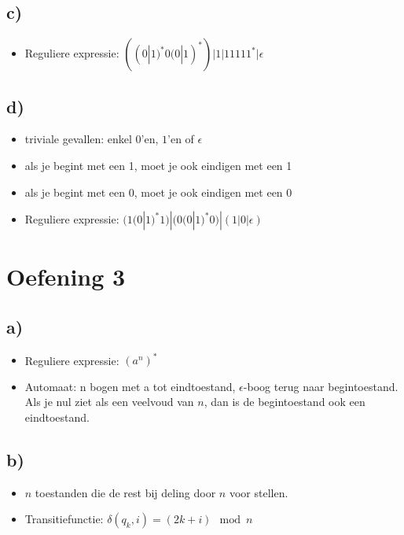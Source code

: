 \documentclass[12pt]{article}
\begin{document}
    \subsection{c)}
    \begin{itemize}
        \item Reguliere expressie: $ ((0|1)^{*}0(0|1)^{*})|1|11111^{*}|\epsilon $
    \end{itemize}
    
    \subsection{d)}
    \begin{itemize}
        \item triviale gevallen: enkel $0$'en, $1$'en of $\epsilon$
        \item als je begint met een 1, moet je ook eindigen met een 1
        \item als je begint met een 0, moet je ook eindigen met een 0
        \item Reguliere expressie:  $ (1 (0|1)^{*} 1) | (0 (0|1)^{*} 0) | (1|0|\epsilon)$
    \end{itemize}
    
    \section{Oefening 3}
    \subsection{a)}
    \begin{itemize}
        \item Reguliere expressie: $ (a^{n})^{*} $
        \item Automaat: n bogen met a tot eindtoestand, $\epsilon$-boog terug naar begintoestand. Als je nul ziet als een veelvoud van $n$, dan is de begintoestand ook een eindtoestand.
    \end{itemize}
    
    \subsection{b)}
    \begin{itemize}
        \item $n$ toestanden die de rest bij deling door $n$ voor stellen.
        \item Transitiefunctie: $ \delta (q_k, i) = (2k + i) \mod n $
    \end{itemize}
\end{document}

